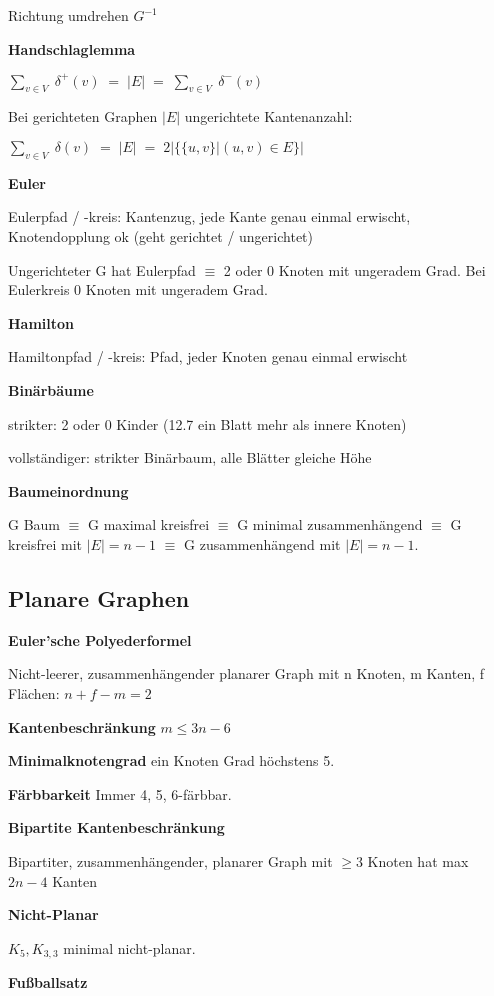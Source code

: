 \documentclass[a4paper,10pt]{article}
\begin{document}
\begin{multicols}{3}
Richtung umdrehen $G^{-1}$

\textbf{Handschlaglemma}

$\sum_{v \in V} \; \delta^+(v) \; = \; |E| \; = \; \sum_{v \in V} \; \delta^-(v)$

Bei gerichteten Graphen $|E|$ ungerichtete Kantenanzahl:

$\sum_{v \in V} \; \delta(v) \; = \; |E| \; = \; 2| \{\{u,v\} | (u,v) \in E\}|$

\textbf{Euler}

Eulerpfad / -kreis: Kantenzug, jede Kante genau einmal erwischt, Knotendopplung ok (geht gerichtet / ungerichtet)

Ungerichteter G hat Eulerpfad $\equiv$ 2 oder 0 Knoten mit ungeradem Grad. Bei Eulerkreis 0 Knoten mit ungeradem Grad.

\textbf{Hamilton}

Hamiltonpfad / -kreis: Pfad, jeder Knoten genau einmal erwischt

\textbf{Binärbäume}

strikter: 2 oder 0 Kinder (12.7 ein Blatt mehr als innere Knoten)

vollständiger: strikter Binärbaum, alle Blätter gleiche Höhe

\textbf{Baumeinordnung}

G Baum $\equiv$ G maximal kreisfrei $\equiv$ G minimal zusammenhängend $\equiv$ G kreisfrei mit $|E|=n-1$ $\equiv$ G zusammenhängend mit $|E|=n-1$.

\subsection{Planare Graphen}

\textbf{Euler'sche Polyederformel}

Nicht-leerer, zusammenhängender planarer Graph mit n Knoten, m Kanten, f Flächen: $n+f-m = 2$

\textbf{Kantenbeschränkung} $m \leq 3n-6$

\textbf{Minimalknotengrad} ein Knoten Grad höchstens 5.

\textbf{Färbbarkeit} Immer 4, 5, 6-färbbar.

\textbf{Bipartite Kantenbeschränkung}

Bipartiter, zusammenhängender, planarer Graph mit $\ge3$ Knoten hat max $2n-4$ Kanten

\textbf{Nicht-Planar}

$K_5, K_{3,3}$ minimal nicht-planar.

\textbf{Fußballsatz}


\end{multicols}
\end{document}
